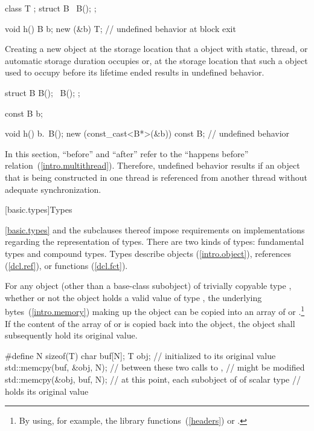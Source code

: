 \begin{codeblock}
class T { };
struct B {
   ~B();
};

void h() {
   B b;
   new (&b) T;
}                               // undefined behavior at block exit
\end{codeblock}
\exitexample 

\pnum
Creating a new object at the storage location that a 
object with static, thread, or automatic storage duration occupies or, at the
storage location that such a  object used to occupy before
its lifetime ended results in undefined behavior. \enterexample

\begin{codeblock}
struct B {
  B();
  ~B();
};

const B b;

void h() {
  b.~B();
  new (const_cast<B*>(&b)) const B;             // undefined behavior
}
\end{codeblock}
\exitexample 

\pnum
In this section, ``before'' and ``after'' refer to the ``happens before''
relation~(\ref{intro.multithread}). \enternote Therefore, undefined behavior results
if an object that is being constructed in one thread is referenced from another
thread without adequate synchronization. \exitnote%

[basic.types]{Types}%

\pnum
\enternote
\ref{basic.types} and the subclauses thereof
impose requirements on implementations regarding the representation
of types.
There are two kinds of types: fundamental types and compound types.
Types describe objects (\ref{intro.object}),
references (\ref{dcl.ref}),
or functions (\ref{dcl.fct}).
\exitnote

\pnum
{}%
%
For any object (other than a base-class subobject) of trivially copyable type
, whether or not the object holds a valid value of type
, the underlying bytes~(\ref{intro.memory}) making up the
object can be copied into an array of  or 
.\footnote{By using, for example, the library
functions~(\ref{headers})  or .}
If the content of the array of  or 
 is copied back into the object, the object shall
subsequently hold its original value. \enterexample

\begin{codeblock}
#define N sizeof(T)
char buf[N];
T obj;                          //  initialized to its original value
std::memcpy(buf, &obj, N);      // between these two calls to ,
                                //  might be modified
std::memcpy(&obj, buf, N);      // at this point, each subobject of  of scalar type
                                // holds its original value
\end{codeblock}
\exitexample 

